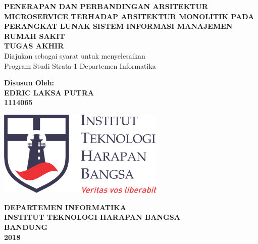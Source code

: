 \begin{titlepage}
\begin{center}
	\onehalfspacing
	{\large \bfseries PENERAPAN DAN PERBANDINGAN ARSITEKTUR MICROSERVICE TERHADAP ARSITEKTUR MONOLITIK PADA PERANGKAT LUNAK SISTEM INFORMASI MANAJEMEN RUMAH SAKIT\\
	\vspace{1.5cm}
	 \large TUGAS AKHIR}\\
           Diajukan sebagai syarat untuk menyelesaikan\\ Program Studi Strata-1 Departemen Informatika

	\vspace{1.5cm}
          {\bfseries Disusun Oleh: \\
           EDRIC LAKSA PUTRA \\
	1114065}
	
	\vspace{1.5cm}
	\includegraphics[width=8cm]{images/ithb.jpg}
	
	
	\vspace{3.5cm}
	
{\large \bfseries DEPARTEMEN INFORMATIKA \\
INSTITUT TEKNOLOGI HARAPAN BANGSA \\
BANDUNG\\
2018}

	
\end{center}

\end{titlepage}

\newpage